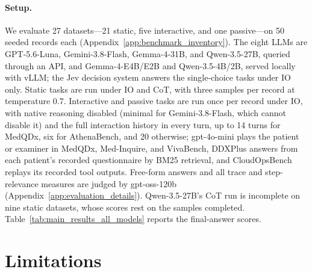 \paragraph{Setup.} We evaluate 27 datasets---21 static, five interactive, and one passive---on 50 seeded records each (Appendix~\ref{app:benchmark_inventory}). The eight LLMs are GPT-5.6-Luna, Gemini-3.8-Flash, Gemma-4-31B, and Qwen-3.5-27B, queried through an API, and Gemma-4-E4B/E2B and Qwen-3.5-4B/2B, served locally with vLLM; the Jev decision system answers the single-choice tasks under IO only. Static tasks are run under IO and CoT, with three samples per record at temperature 0.7. Interactive and passive tasks are run once per record under IO, with native reasoning disabled (minimal for Gemini-3.8-Flash, which cannot disable it) and the full interaction history in every turn, up to 14 turns for MedQDx, six for AthenaBench, and 20 otherwise; gpt-4o-mini plays the patient or examiner in MedQDx, Med-Inquire, and VivaBench, DDXPlus answers from each patient's recorded questionnaire by BM25 retrieval, and CloudOpsBench replays its recorded tool outputs. Free-form answers and all trace and step-relevance measures are judged by gpt-oss-120b (Appendix~\ref{app:evaluation_details}). Qwen-3.5-27B's CoT run is incomplete on nine static datasets, whose scores rest on the samples completed. Table~\ref{tab:main_results_all_models} reports the final-answer scores.


\section{Limitations}
\label{sec:future_work}

